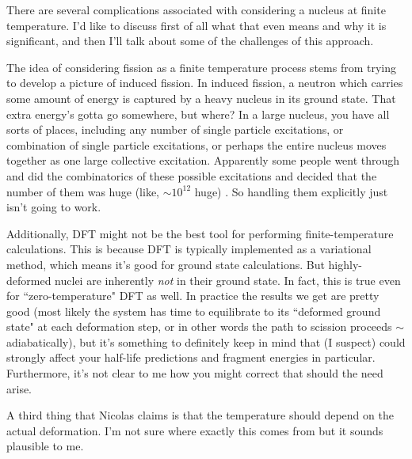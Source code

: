 There are several complications associated with considering a nucleus at finite temperature. I'd like to discuss first of all what that even means and why it is significant, and then I'll talk about some of the challenges of this approach.

The idea of considering fission as a finite temperature process stems from trying to develop a picture of induced fission. In induced fission, a neutron which carries some amount of energy is captured by a heavy nucleus in its ground state. That extra energy's gotta go somewhere, but where? In a large nucleus, you have all sorts of places, including any number of single particle excitations, or combination of single particle excitations, or perhaps the entire nucleus moves together as one large collective excitation. Apparently some people went through and did the combinatorics of these possible excitations and decided that the number of them was huge (like, $\sim10^{12}$ huge) \cite{Hilaire2012}. So handling them explicitly just isn't going to work.

Additionally, DFT might not be the best tool for performing finite-temperature calculations. This is because DFT is typically implemented as a variational method, which means it's good for ground state calculations. But highly-deformed nuclei are inherently \textit{not} in their ground state. In fact, this is true even for ``zero-temperature" DFT as well. In practice the results we get are pretty good (most likely the system has time to equilibrate to its ``deformed ground state" at each deformation step, or in other words the path to scission proceeds $\sim$adiabatically), but it's something to definitely keep in mind that (I suspect) could strongly affect your half-life predictions and fragment energies in particular. Furthermore, it's not clear to me how you might correct that should the need arise.

A third thing that Nicolas claims is that the temperature should depend on the actual deformation. I'm not sure where exactly this comes from but it sounds plausible to me.
